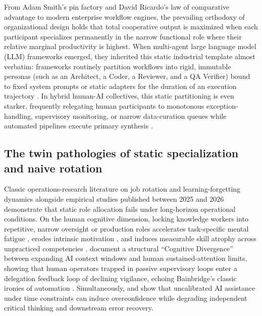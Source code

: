 \documentclass[11pt]{article}
\begin{document}
From Adam Smith's pin factory and David Ricardo's law of comparative advantage to modern enterprise workflow engines, the prevailing orthodoxy of organizational design holds that total cooperative output is maximized when each participant specializes permanently in the narrow functional role where their relative marginal productivity is highest. When multi-agent large language model (LLM) frameworks emerged, they inherited this static industrial template almost verbatim: frameworks routinely partition workflows into rigid, immutable personas (such as an Architect, a Coder, a Reviewer, and a QA Verifier) bound to fixed system prompts or static adapters for the duration of an execution trajectory \citep{cemri2025mast, kim2025scaling}. In hybrid human-AI collectives, this static partitioning is even starker, frequently relegating human participants to monotonous exception-handling, supervisory monitoring, or narrow data-curation queues while automated pipelines execute primary synthesis \citep{bainbridge1983ironies, shen2026coding}.

\subsection{The twin pathologies of static specialization and naive rotation}

Classic operations-research literature on job rotation and learning-forgetting dynamics \citep{jaber1996learning, ortega2001jobrotation, hopp2004chaining} alongside empirical studies published between 2025 and 2026 demonstrate that static role allocation fails under long-horizon operational conditions. On the human cognitive dimension, locking knowledge workers into repetitive, narrow oversight or production roles accelerates task-specific mental fatigue \citep{meijman1998effort}, erodes intrinsic motivation \citep{ryan2000sdt}, and induces measurable skill atrophy across unpracticed competencies \citep{jaber1996learning, shen2026coding, kosmyna2025brain}. \citet{eliav2026divergence} document a structural ``Cognitive Divergence'' between expanding AI context windows and human sustained-attention limits, showing that human operators trapped in passive supervisory loops enter a delegation feedback loop of declining vigilance, echoing Bainbridge's classic ironies of automation \citep{bainbridge1983ironies}. Simultaneously, \citet{eleftheriou2026confidence} and \citet{zhi2026timeconstraints} show that uncalibrated AI assistance under time constraints can induce overconfidence while degrading independent critical thinking and downstream error recovery.
\end{document}
